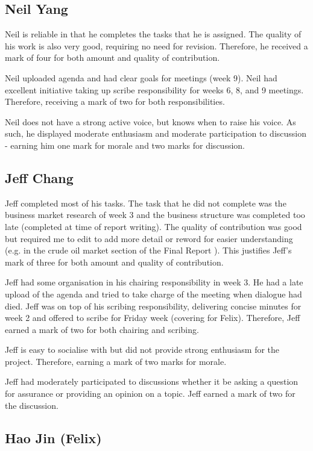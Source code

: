 \documentclass[11pt, a4, nocenter, margin=150mm]{article}
\begin{document}
	\subsection{Neil Yang}

	Neil is reliable in that he completes the tasks that he is assigned. The quality of his work is also very good, requiring no need for revision. Therefore, he received a mark of four for both amount and quality of contribution.

	Neil uploaded agenda and had clear goals for meetings (week 9). Neil had excellent initiative taking up scribe responsibility for weeks 6, 8, and 9 meetings. Therefore, receiving a mark of two for both responsibilities.
	
	Neil does not have a strong active voice, but knows when to raise his voice. As such, he displayed moderate enthusiasm and moderate participation to discussion - earning him one mark for morale and two marks for discussion.

	\subsection{Jeff Chang}

	Jeff completed most of his tasks. The task that he did not complete was the business market research of week 3 and the business structure was completed too late (completed at time of report writing). The quality of contribution was good but required me to edit to add more detail or reword for easier understanding (e.g. in the crude oil market section of the Final Report \cite{report}). This justifies Jeff's mark of three for both amount and quality of contribution.
	
	Jeff had some organisation in his chairing responsibility in week 3. He had a late upload of the agenda and tried to take charge of the meeting when dialogue had died. Jeff was on top of his scribing responsibility, delivering concise minutes for week 2 and offered to scribe for Friday week (covering for Felix). Therefore, Jeff earned a mark of two for both chairing and scribing.

	Jeff is easy to socialise with but did not provide strong enthusiasm for the project. Therefore, earning a mark of two marks for morale.
	
	Jeff had moderately participated to discussions whether it be asking a question for assurance or providing an opinion on a topic. Jeff earned a mark of two for the discussion.

	\subsection{Hao Jin (Felix)}
\end{document}
